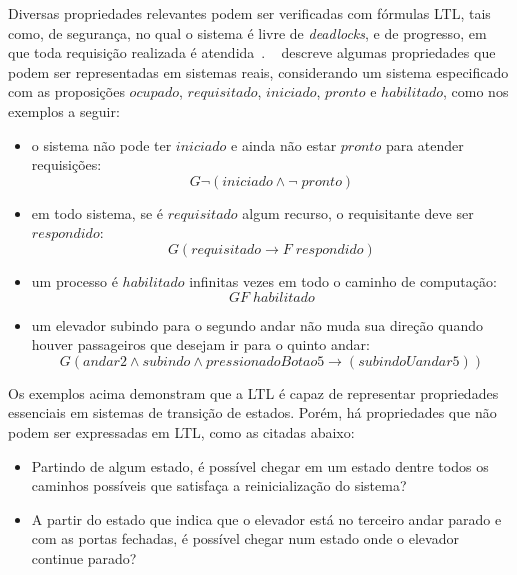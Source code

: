 Diversas propriedades relevantes podem ser verificadas com fórmulas LTL, tais como, de segurança, no qual o sistema é livre de \textit{deadlocks}, e de progresso, em que toda requisição realizada é atendida~\cite{mura2016, huth2004logic}. ~\citeauthor{huth2004logic} descreve algumas propriedades que podem ser representadas em sistemas reais, considerando um sistema especificado com as proposições $ocupado$, $requisitado$, $iniciado$, $pronto$ e $habilitado$, como nos exemplos a seguir:

\begin{itemize}
	\item o sistema não pode ter $iniciado$ e ainda não estar $pronto$ para atender requisições: 
	\begin{equation}
	G\neg(iniciado\wedge\neg\;pronto)
	\end{equation} 
	\item em todo sistema, se é $requisitado$ algum recurso, o requisitante deve ser $respondido$:
	\begin{equation}
	G(requisitado \to F\;respondido)
	\end{equation}
	\item um processo é $habilitado$ infinitas vezes em todo o caminho de computação: 
	\begin{equation}
	GF\;habilitado 
	\end{equation}
	\item um elevador subindo para o segundo andar não muda sua direção quando houver passageiros que desejam ir para o quinto andar: 
	\begin{equation}
	G(andar2 \wedge subindo \wedge pressionadoBotao5 \to (subindo U andar5))
	\end{equation}
\end{itemize}

Os exemplos acima demonstram que a LTL é capaz de representar propriedades essenciais em sistemas de transição de estados. Porém, há propriedades que não podem ser expressadas em LTL, como as citadas abaixo:

\begin{itemize}
	\item Partindo de algum estado, é possível chegar em um estado dentre todos os caminhos possíveis que satisfaça a reinicialização do sistema?
	\item A partir do estado que indica que o elevador está no terceiro andar parado e com as portas fechadas, é possível chegar num estado onde o elevador continue parado?
\end{itemize}

